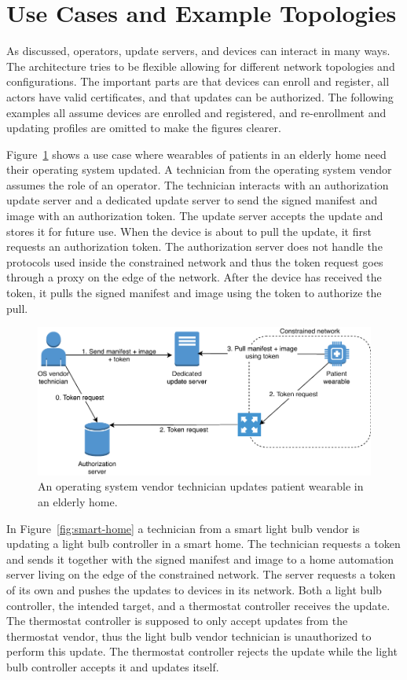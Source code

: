 \documentclass[0-thesis.tex]{subfiles}
\begin{document}
\section{Use Cases and Example Topologies}
\label{sec:use-cases-examples-topologies}
As discussed, operators, update servers, and devices can interact in many ways. The
architecture tries to be flexible allowing for different network topologies and
configurations. The important parts are that devices can enroll and register, all actors
have valid certificates, and that updates can be authorized. The following examples all
assume devices are enrolled and registered, and re-enrollment and updating profiles are
omitted to make the figures clearer.

Figure~\ref{fig:elderly-home} shows a use case where wearables of patients in an elderly
home need their operating system updated. A technician from the operating system vendor
assumes the role of an operator. The technician interacts with an authorization update
server and a dedicated update server to send the signed manifest and image with an
authorization token. The update server accepts the update and stores it for future use.
When the device is about to pull the update, it first requests an authorization token. The
authorization server does not handle the protocols used inside the constrained network and
thus the token request goes through a proxy on the edge of the network. After the device
has received the token, it pulls the signed manifest and image using the token to
authorize the pull.

\begin{figure}
    \caption{An operating system vendor technician updates patient wearable in an elderly home.}
    \label{fig:elderly-home}
    \includegraphics{images/use-case-elderly-home.pdf}
\end{figure}

In Figure~\ref{fig:smart-home} a technician from a smart light bulb vendor is updating a
light bulb controller in a smart home. The technician requests a token and sends it
together with the signed manifest and image to a home automation server living on the edge
of the constrained network. The server requests a token of its own and pushes the updates
to devices in its network. Both a light bulb controller, the intended target, and a
thermostat controller receives the update. The thermostat controller is supposed to only
accept updates from the thermostat vendor, thus the light bulb vendor technician is
unauthorized to perform this update. The thermostat controller rejects the update while
the light bulb controller accepts it and updates itself.
\end{document}
